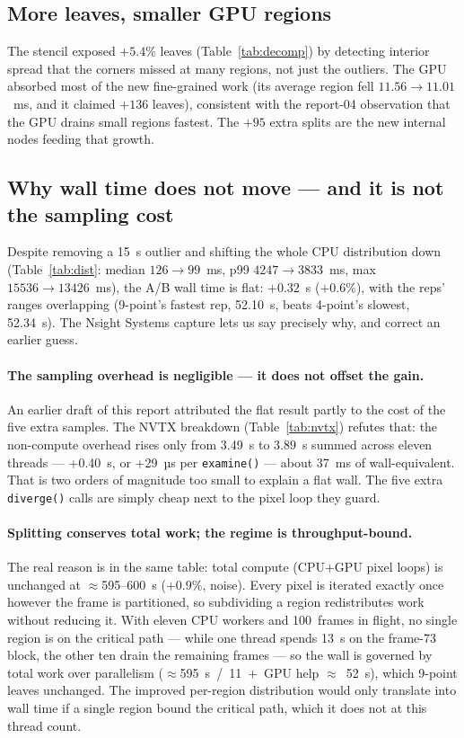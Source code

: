 \documentclass[
	english,
	letterpaper, oneside
]{article}
\begin{document}
\subsection{More leaves, smaller GPU regions}

The stencil exposed $+5.4\%$ leaves (Table~\ref{tab:decomp}) by detecting
interior spread that the corners missed at many regions, not just the
outliers. The GPU absorbed most of the new fine-grained work (its average
region fell $11.56\to11.01$~ms, and it claimed $+136$ leaves), consistent with
the report-04 observation that the GPU drains small regions fastest. The
$+95$ extra splits are the new internal nodes feeding that growth.

\subsection{Why wall time does not move --- and it is not the sampling cost}

Despite removing a 15~s outlier and shifting the whole CPU distribution down
(Table~\ref{tab:dist}: median $126\to99$~ms, p99 $4247\to3833$~ms, max
$15536\to13426$~ms), the A/B wall time is flat: $+0.32$~s ($+0.6\%$), with the
reps' ranges overlapping (9-point's fastest rep, 52.10~s, beats 4-point's
slowest, 52.34~s). The Nsight Systems capture lets us say precisely why, and
correct an earlier guess.

\paragraph{The sampling overhead is negligible --- it does not offset the
gain.} An earlier draft of this report attributed the flat result partly to the
cost of the five extra samples. The NVTX breakdown (Table~\ref{tab:nvtx})
refutes that: the non-compute overhead rises only from 3.49~s to 3.89~s summed
across eleven threads --- +0.40~s, or +29~µs per \texttt{examine()} ---
about 37~ms of wall-equivalent. That is two orders of magnitude too small to
explain a flat wall. The five extra \texttt{diverge()} calls are simply cheap
next to the pixel loop they guard.

\paragraph{Splitting conserves total work; the regime is throughput-bound.} The
real reason is in the same table: total compute (CPU+GPU pixel loops) is
unchanged at $\approx$595--600~s ($+0.9\%$, noise). Every pixel is iterated
exactly once however the frame is partitioned, so subdividing a region
redistributes work without reducing it. With eleven CPU workers and
100~frames in flight, no single region is on the critical path --- while one
thread spends 13~s on the frame-73 block, the other ten drain the remaining
frames --- so the wall is governed by total work over parallelism
($\approx$595~s~/~11~$+$~GPU help $\approx$~52~s), which 9-point leaves
unchanged. The improved per-region distribution would only translate into wall
time if a single region bound the critical path, which it does not at this
thread count.
\end{document}
